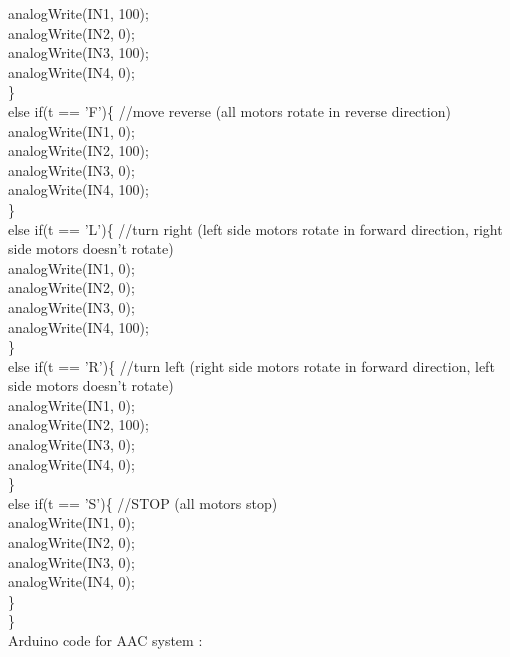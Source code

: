 \documentclass[12pt,a4paper]{report}
\begin{document}
  analogWrite(IN1, 100);\\
  analogWrite(IN2, 0);\\
  analogWrite(IN3, 100);\\
  analogWrite(IN4, 0);\\
\}\\
else if(t == 'F')\{      //move reverse (all motors rotate in reverse direction)\\
  analogWrite(IN1, 0);\\
  analogWrite(IN2, 100);\\
  analogWrite(IN3, 0);\\
  analogWrite(IN4, 100);\\
\}\\
else if(t == 'L')\{      //turn right (left side motors rotate in forward direction, right side motors doesn't rotate)\\
  analogWrite(IN1, 0);\\
  analogWrite(IN2, 0);\\
  analogWrite(IN3, 0);\\
  analogWrite(IN4, 100);\\
\}\\
else if(t == 'R')\{      //turn left (right side motors rotate in forward direction, left side motors doesn't rotate)\\
   analogWrite(IN1, 0);\\
  analogWrite(IN2, 100);\\
  analogWrite(IN3, 0);\\
  analogWrite(IN4, 0);\\
\}\\
else if(t == 'S')\{      //STOP (all motors stop)\\
  analogWrite(IN1, 0);\\
  analogWrite(IN2, 0);\\
  analogWrite(IN3, 0);\\
  analogWrite(IN4, 0);\\
\}\\
\}\\

{\large Arduino code for AAC system :}
\end{document}
